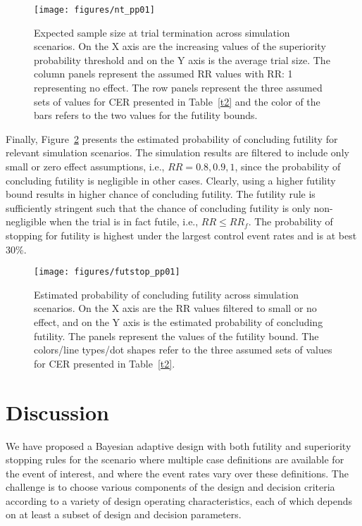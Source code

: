 \documentclass[12pt]{article}
\begin{document}
\begin{figure}[t]
	
	\centering
	\texttt{[image: figures/nt\_pp01]}
	\caption{Expected sample size at trial termination across simulation scenarios. On the X axis are the increasing values of the superiority probability threshold and on the Y axis is the average trial size. The column panels represent the assumed RR values with RR: 1 representing no effect.  The row panels represent the three assumed sets of values for CER presented in Table~\ref{t2} and the color of the bars refers to the two values for the futility bounds.}
	\label{fig:nt}
	
\end{figure}

Finally, Figure~\ref{fig:fut} presents the estimated probability of concluding futility for relevant simulation scenarios. The simulation results are filtered to include only small or zero effect assumptions, i.e., $RR = 0.8, 0.9, 1$, since the probability of concluding futility is negligible in other cases. Clearly, using a higher futility bound results in higher chance of concluding futility. The futility rule is sufficiently stringent such that the chance of concluding futility is only non-negligible when the trial is in fact futile, i.e., $RR\leq RR_f$. The probability of stopping for futility is highest under the largest control event rates and is at best 30\%.

\begin{figure}[t]
	
	\centering
	\texttt{[image: figures/futstop\_pp01]}
	\caption{Estimated probability of concluding futility across simulation scenarios. On the X axis are the RR values filtered to small or no effect, and on the Y axis is the estimated probability of concluding futility. The panels represent the values of the futility bound. The colors/line types/dot shapes refer to the three assumed sets of values for CER presented in Table~\ref{t2}.}
	\label{fig:fut}
	
\end{figure}


\section{Discussion}\label{Sec:dis}
We have proposed a Bayesian adaptive design with both futility and superiority stopping rules for the scenario where multiple case definitions are available for the event of interest, and where the event rates vary over these definitions. The challenge is to choose various components of the design and decision criteria according to a variety of design operating characteristics, each of which depends on at least a subset of design and decision parameters. 
\end{document}
